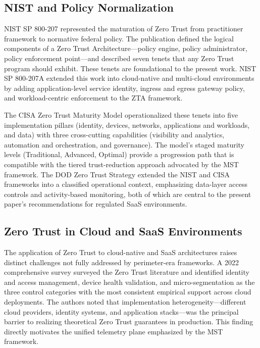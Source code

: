 \documentclass[acmlarge]{acmart}
\begin{document}
\subsection{NIST and Policy Normalization}

NIST SP 800-207 \cite{rose2020} represented the maturation of Zero Trust from
practitioner framework to normative federal policy. The publication defined the logical
components of a Zero Trust Architecture---policy engine, policy administrator, policy
enforcement point---and described seven tenets that any Zero Trust program should exhibit.
These tenets are foundational to the present work. NIST SP 800-207A \cite{chandramouli2023} extended this work into cloud-native and multi-cloud environments
by adding application-level service identity, ingress and egress gateway policy, and
workload-centric enforcement to the ZTA framework.

The CISA Zero Trust Maturity Model \cite{cisa2023} operationalized these tenets into five
implementation pillars (identity, devices, networks, applications and workloads, and data)
with three cross-cutting capabilities (visibility and analytics, automation and
orchestration, and governance). The model's staged maturity levels (Traditional, Advanced,
Optimal) provide a progression path that is compatible with the tiered trust-reduction
approach advocated by the MST framework. The DOD Zero Trust Strategy \cite{dod2022}
extended the NIST and CISA frameworks into a classified operational context, emphasizing
data-layer access controls and activity-based monitoring, both of which are central to
the present paper's recommendations for regulated SaaS environments.

\subsection{Zero Trust in Cloud and SaaS Environments}

The application of Zero Trust to cloud-native and SaaS architectures raises distinct
challenges not fully addressed by perimeter-era frameworks. A 2022 comprehensive survey \cite{syed2022}
surveyed the Zero Trust literature and identified identity and access management, device
health validation, and micro-segmentation as the three control categories with the most
consistent empirical support across cloud deployments. The authors noted that
implementation heterogeneity---different cloud providers, identity systems, and application
stacks---was the principal barrier to realizing theoretical Zero Trust guarantees in
production. This finding directly motivates the unified telemetry plane emphasized by the
MST framework.
\end{document}
